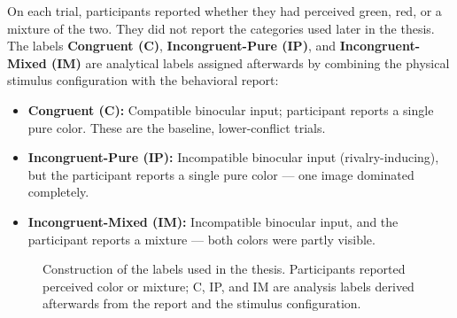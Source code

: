 \documentclass[11pt,a4paper,chapterprefix=false,parskip=false]{scrreprt}
\begin{document}
On each trial, participants reported whether they had perceived green, red, or a mixture of the two. They did not report the categories used later in the thesis. The labels \textbf{Congruent (C)}, \textbf{Incongruent-Pure (IP)}, and \textbf{Incongruent-Mixed (IM)} are analytical labels assigned afterwards by combining the physical stimulus configuration with the behavioral report:

\begin{itemize}
    \item \textbf{Congruent (C):} Compatible binocular input; participant reports a single pure color. These are the baseline, lower-conflict trials.
    \item \textbf{Incongruent-Pure (IP):} Incompatible binocular input (rivalry-inducing), but the participant reports a single pure color --- one image dominated completely.
    \item \textbf{Incongruent-Mixed (IM):} Incompatible binocular input, and the participant reports a mixture --- both colors were partly visible.
\end{itemize}

\begin{figure}[H]
    \centering
    \caption{Construction of the labels used in the thesis. Participants reported perceived color or mixture; C, IP, and IM are analysis labels derived afterwards from the report and the stimulus configuration.}
    \label{fig:label-construction}
\end{figure}
\end{document}

